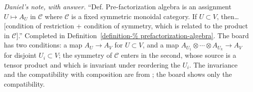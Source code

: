 \medskip\noindent
\textit{Daniel's note, with answer.}
``Def. Pre-factorization algebra is an
assignment $U\mapsto A_U$ in $\mathcal{C}$
where $\mathcal{C}$ is a fixed symmetric
monoidal category. If $U\subset V$,
then\ldots{} [condition of restriction +
condition of symmetry, which is related to
the product in $\mathcal{C}$].'' Completed in
Definition~\ref{definition-%
prefactorization-algebra}.
The board has two conditions: a map
$A_U\to A_V$ for $U\subset V$, and a map
$A_{U_1}\otimes\cdots\otimes A_{U_k}\to A_V$
for disjoint $U_i\subset V$; the symmetry of
$\mathcal{C}$ enters in the second, whose
source is a tensor product and which is
invariant under reordering the $U_i$. The
invariance and the compatibility with
composition are from
\cite{CostelloGwilliam2017}; the board
shows only the compatibility.







